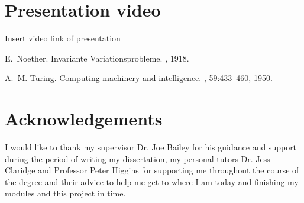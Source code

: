 \documentclass[12pt, a4paper,oneside]{book}
\numberwithin{equation}{section}
\begin{document}
\section*{Presentation video}\label{secx.x}
Insert video link of presentation


\begin{thebibliography}{999}

E.~Noether.
\newblock Invariante {V}ariationsprobleme.
, 1918.

A.~M. Turing.
\newblock Computing machinery and intelligence.
, 59:433--460, 1950.

\end{thebibliography}

\section*{Acknowledgements}
I would like to thank my supervisor Dr. Joe Bailey for his guidance and support during the period of writing my dissertation, my personal tutors Dr. Jess Claridge and Professor Peter Higgins for supporting me throughout the course of the degree and their advice to help me get to where I am today and finishing my modules and this project in time.
\end{document}

